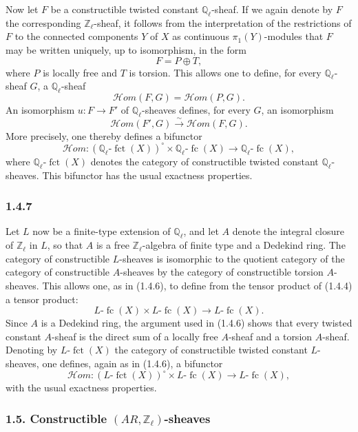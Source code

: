 \documentclass[11pt]{article}
\providecommand{\fct}{\operatorname{fct}}
\providecommand{\cHom}{\mathcal{H}om}
\providecommand{\fc}{\operatorname{fc}}
\begin{document}
Now let \(F\) be a constructible twisted constant \(\mathbb Q_\ell\)-sheaf. If we again denote by \(F\) the corresponding \(\mathbb Z_\ell\)-sheaf, it follows from the interpretation of the restrictions of \(F\) to the connected components \(Y\) of \(X\) as continuous \(\pi_1(Y)\)-modules that \(F\) may be written uniquely, up to isomorphism, in the form
\[
F=P\oplus T,
\]
where \(P\) is locally free and \(T\) is torsion. This allows one to define, for every \(\mathbb Q_\ell\)-sheaf \(G\), a \(\mathbb Q_\ell\)-sheaf
\[
\cHom(F,G)=\cHom(P,G).
\]
An isomorphism \(u:F\to F'\) of \(\mathbb Q_\ell\)-sheaves defines, for every \(G\), an isomorphism
\[
\cHom(F',G)\xrightarrow{\sim}\cHom(F,G).
\]
More precisely, one thereby defines a bifunctor
\[
\cHom:(\mathbb Q_\ell\text{-}\fct(X))^\circ\times \mathbb Q_\ell\text{-}\fc(X)
\longrightarrow \mathbb Q_\ell\text{-}\fc(X),
\]
where \(\mathbb Q_\ell\text{-}\fct(X)\) denotes the category of constructible twisted constant \(\mathbb Q_\ell\)-sheaves. This bifunctor has the usual exactness properties.

\subsubsection*{1.4.7}
Let \(L\) now be a finite-type extension of \(\mathbb Q_\ell\), and let \(A\) denote the integral closure of \(\mathbb Z_\ell\) in \(L\), so that \(A\) is a free \(\mathbb Z_\ell\)-algebra of finite type and a Dedekind ring. The category of constructible \(L\)-sheaves is isomorphic to the quotient category of the category of constructible \(A\)-sheaves by the category of constructible torsion \(A\)-sheaves. This allows one, as in (1.4.6), to define from the tensor product of (1.4.4) a tensor product:
\[
L\text{-}\fc(X)\times L\text{-}\fc(X)\longrightarrow L\text{-}\fc(X).
\]
Since \(A\) is a Dedekind ring, the argument used in (1.4.6) shows that every twisted constant \(A\)-sheaf is the direct sum of a locally free \(A\)-sheaf and a torsion \(A\)-sheaf. Denoting by \(L\text{-}\fct(X)\) the category of constructible twisted constant \(L\)-sheaves, one defines, again as in (1.4.6), a bifunctor
\[
\cHom:(L\text{-}\fct(X))^\circ\times L\text{-}\fc(X)
\longrightarrow L\text{-}\fc(X),
\]
with the usual exactness properties.

\subsubsection*{1.5. Constructible \((AR,\mathbb Z_\ell)\)-sheaves}
\end{document}
